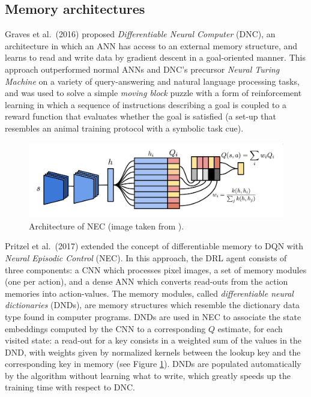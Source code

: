 \subsection{Memory architectures} \label{s:memory}
Graves et al.\ (2016) \cite{graves2016hybrid} proposed \textit{Differentiable 
Neural Computer} (DNC), an architecture in which an ANN has access to an 
external memory structure, and learns to read and write data by gradient descent
in a goal-oriented manner.
This approach outperformed normal ANNs and DNC's precursor \textit{Neural 
Turing Machine} \cite{gravesneural} on a variety of query-answering and natural 
language processing tasks, and was used to solve a simple \textit{moving block} 
puzzle with a form of reinforcement learning in which a sequence of instructions
describing a goal is coupled to a reward function that evaluates whether the 
goal is satisfied (a set-up that resembles an animal training protocol with a 
symbolic task cue).
%
\begin{figure}
    \includegraphics[width=\textwidth]{pictures/nec}
    \centering
    \caption[Architecture of NEC]{Architecture of NEC (image taken from 
				\cite{pritzel2017neural}).}
\label{f:nec}
\end{figure}
%

Pritzel et al.\ (2017) \cite{pritzel2017neural} extended the concept of 
differentiable memory to DQN with \textit{Neural Episodic Control} (NEC). 
In this approach, the DRL agent consists of three components: a CNN which 
processes pixel images, a set of memory modules (one per action), and a dense 
ANN which converts read-outs from the action memories into action-values. The 
memory modules, called \textit{differentiable neural dictionaries} (DNDs), are 
memory structures which resemble the dictionary data type found in computer 
programs. DNDs are used in NEC to associate the state embeddings computed by the
CNN to a corresponding $Q$ estimate, for each visited state: a read-out for a 
key consists in a weighted sum of the values in the DND, with weights given by 
normalized kernels between the lookup key and the corresponding key in memory 
(see Figure \ref{f:nec}). 
DNDs are populated automatically by the algorithm without learning what to write,
which greatly speeds up the training time with respect to DNC.

